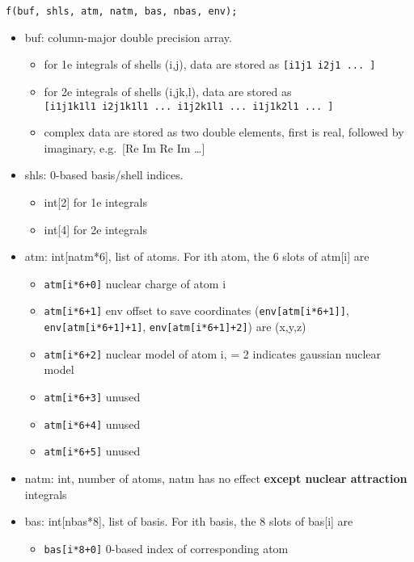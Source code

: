 \documentclass{article}
\begin{document}
\begin{verbatim}
f(buf, shls, atm, natm, bas, nbas, env);
\end{verbatim}
\begin{itemize}
\item
  buf: column-major double precision array.
  \begin{itemize}
  \item
    for 1e integrals of shells (i,j), data are stored as
    \verb![i1j1 i2j1 ... ]!
  \item
    for 2e integrals of shells (i,j\textbar{}k,l), data are stored as\\
    \verb![i1j1k1l1 i2j1k1l1 ... i1j2k1l1 ... i1j1k2l1 ... ]!
  \item
    complex data are stored as two double elements, first is real,
    followed by imaginary, e.g.~[Re Im Re Im \ldots{}]
  \end{itemize}
\item
  shls: 0-based basis/shell indices.
  \begin{itemize}
  \item
    int[2] for 1e integrals
  \item
    int[4] for 2e integrals
  \end{itemize}
\item
  atm: int[natm*6], list of atoms. For ith atom, the 6 slots of
  atm[i] are
  \begin{itemize}
  \item
    \verb!atm[i*6+0]! nuclear charge of atom i
  \item
    \verb!atm[i*6+1]! env offset to save coordinates
    (\verb!env[atm[i*6+1]]!, \verb!env[atm[i*6+1]+1]!,
    \verb!env[atm[i*6+1]+2]!) are (x,y,z)
  \item
    \verb!atm[i*6+2]! nuclear model of atom i, = 2 indicates gaussian
    nuclear model
  \item
    \verb!atm[i*6+3]! unused
  \item
    \verb!atm[i*6+4]! unused
  \item
    \verb!atm[i*6+5]! unused
  \end{itemize}
\item
  natm: int, number of atoms, natm has no effect
  \textbf{except nuclear attraction} integrals
\item
  bas: int[nbas*8], list of basis. For ith basis, the 8 slots of
  bas[i] are
  \begin{itemize}
  \item
    \verb!bas[i*8+0]! 0-based index of corresponding atom

\end{itemize}
\end{itemize}
\end{document}
